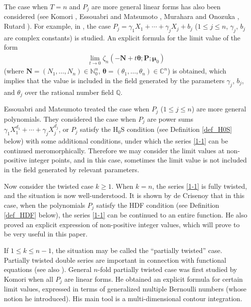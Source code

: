 \documentclass[a4paper,12pt]{article}
\theoremstyle{definition}
\numberwithin{equation}{section}
\begin{document}
The case when $T=n$ and $P_j$ are more general linear forms has also been considered (see
Komori \cite{Komo10}, Essouabri and Matsumoto \cite{EM20}, 
Murahara and Onozuka \cite{MuOn}, Rutard \cite{Rutard}).
For example, in \cite{EM20}, the case
$P_j=\gamma_1X_1+\cdots+\gamma_jX_j+b_j$ ($1\leq j\leq n$, $\gamma_j$, $b_j$ are complex
constants) is studied.    An explicit formula for the limit value of the form
\begin{align}\label{1-3}
\lim_{t\to 0}\zeta_n(-\mathbf{N}+t\boldsymbol{\theta};\mathbf{P};\boldsymbol{\mu}_0)
\end{align}
(where $\mathbf{N}=(N_1,\ldots,N_n)\in \mathbb{N}_0^n$,
$\boldsymbol{\theta}=(\theta_1,\ldots,\theta_n)\in\mathbb{C}^n$)
is obtained, which implies that the value is included in the field generated by the parameters
$\gamma_j$, $b_j$, and $\theta_j$ over the rational number field $\mathbb{Q}$.

Essouabri and Matsumoto \cite{EM21} treated the case when $P_j$ ($1\leq j\leq n$)
are more general polynomials.
They considered the case when $P_j$ are power sums
$\gamma_1 X_1^{d_1}+\cdots+\gamma_j X_j^{d_j}$, or $P_j$ satisfy the $\mathrm{H_0S}$ condition
(see Definition \ref{def_H0S} below) with some additional conditions, under which
the series \eqref{1-1} can be continued meromorphically.
Therefore we may consider the limit values at non-positive integer points, and
in this case, sometimes the limit value is not included in the field generated by relevant
parameters.

Now consider the twisted case $k\geq 1$.   
When $k=n$, the series \eqref{1-1} is fully twisted, and the situation is now well-understood. It is shown by de Crisenoy \cite{dC} that in this case, when the polynomials
$P_j$ satisfy the HDF condition (see Definition \ref{def_HDF} below), 
the series \eqref{1-1} can be continued to an
entire function. He also proved an explicit expression of non-positive integer values, which will prove to be very useful in this paper.

If $1\leq k\leq n-1$, the situation may be called the ``partially twisted''
case.   Partially twisted double series are important in connection
with functional equations \cite{Mats04} \cite{KMT11} (see also
\cite{ChMa16} \cite{ChMa17}).
General $n$-fold partially twisted case was first studied by Komori \cite{Komo10} when all $P_j$ are
linear forms.   He obtained an explicit formula for certain limit values, expressed in terms of
generalized multiple Bernoulli numbers (whose notion he introduced).   His main tool is 
a multi-dimensional contour integration.
\end{document}
